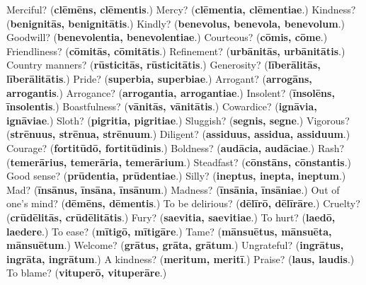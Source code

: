 \begin{tcolorbox}[breakable,colback=teal!4,colframe=teal!35!black,title={Before you move on}]
Merciful? (\textbf{clēmēns, clēmentis}.) Mercy? (\textbf{clēmentia, clēmentiae}.) Kindness? (\textbf{benignitās, benignitātis}.) Kindly? (\textbf{benevolus, benevola, benevolum}.) Goodwill? (\textbf{benevolentia, benevolentiae}.) Courteous? (\textbf{cōmis, cōme}.) Friendliness? (\textbf{cōmitās, cōmitātis}.) Refinement? (\textbf{urbānitās, urbānitātis}.) Country manners? (\textbf{rūsticitās, rūsticitātis}.) Generosity? (\textbf{līberālitās, līberālitātis}.) Pride? (\textbf{superbia, superbiae}.) Arrogant? (\textbf{arrogāns, arrogantis}.) Arrogance? (\textbf{arrogantia, arrogantiae}.) Insolent? (\textbf{īnsolēns, īnsolentis}.) Boastfulness? (\textbf{vānitās, vānitātis}.) Cowardice? (\textbf{ignāvia, ignāviae}.) Sloth? (\textbf{pigritia, pigritiae}.) Sluggish? (\textbf{segnis, segne}.) Vigorous? (\textbf{strēnuus, strēnua, strēnuum}.) Diligent? (\textbf{assiduus, assidua, assiduum}.) Courage? (\textbf{fortitūdō, fortitūdinis}.) Boldness? (\textbf{audācia, audāciae}.) Rash? (\textbf{temerārius, temerāria, temerārium}.) Steadfast? (\textbf{cōnstāns, cōnstantis}.) Good sense? (\textbf{prūdentia, prūdentiae}.) Silly? (\textbf{ineptus, inepta, ineptum}.) Mad? (\textbf{īnsānus, īnsāna, īnsānum}.) Madness? (\textbf{īnsānia, īnsāniae}.) Out of one's mind? (\textbf{dēmēns, dēmentis}.) To be delirious? (\textbf{dēlīrō, dēlīrāre}.) Cruelty? (\textbf{crūdēlitās, crūdēlitātis}.) Fury? (\textbf{saevitia, saevitiae}.) To hurt? (\textbf{laedō, laedere}.) To ease? (\textbf{mītigō, mītigāre}.) Tame? (\textbf{mānsuētus, mānsuēta, mānsuētum}.) Welcome? (\textbf{grātus, grāta, grātum}.) Ungrateful? (\textbf{ingrātus, ingrāta, ingrātum}.) A kindness? (\textbf{meritum, meritī}.) Praise? (\textbf{laus, laudis}.) To blame? (\textbf{vituperō, vituperāre}.)
\end{tcolorbox}
